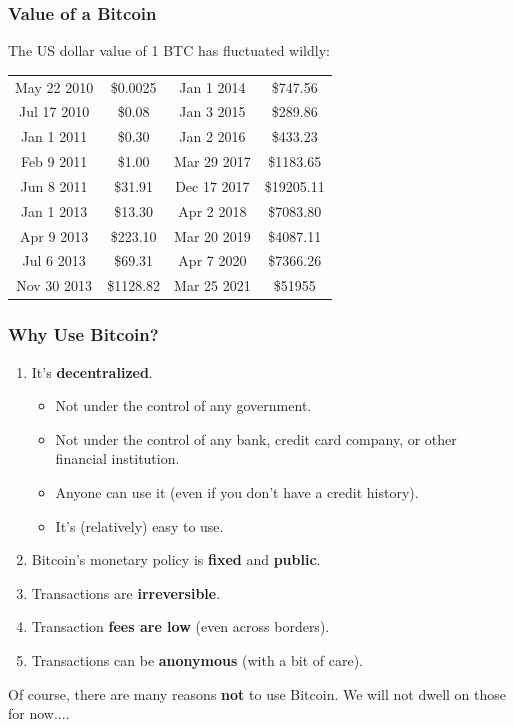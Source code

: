 \documentclass[12pt,titlepage]{article}
\begin{document}
\subsubsection{Value of a Bitcoin}
The US dollar value of 1 BTC has ﬂuctuated wildly:
\begin{center}
	\begin{tabular}{|cc|cc|}
		\hline
		May 22 2010 & \$0.0025 & Jan 1 2014 & \$747.56\\
		Jul 17 2010 & \$0.08 & Jan 3 2015 & \$289.86\\
		Jan 1 2011 & \$0.30 & Jan 2 2016 & \$433.23\\
		Feb 9 2011 & \$1.00 & Mar 29 2017 & \$1183.65\\
		Jun 8 2011 & \$31.91 & Dec 17 2017 & \$19205.11\\
		Jan 1 2013 & \$13.30 & Apr 2 2018 & \$7083.80\\
		Apr 9 2013 & \$223.10 & Mar 20 2019 & \$4087.11\\
		Jul 6 2013 & \$69.31 & Apr 7 2020 & \$7366.26\\
		Nov 30 2013 & \$1128.82 & Mar 25 2021 & \$51955\\ 
		\hline
	\end{tabular}
\end{center}
\subsubsection{Why Use Bitcoin?}
\begin{enumerate}
	\item It’s \textbf{decentralized}.\begin{itemize}
		\item Not under the control of any government.
		\item Not under the control of any bank, credit card company, or other financial institution.
		\item Anyone can use it (even if you don’t have a credit history).
		\item It’s (relatively) easy to use.
	\end{itemize}
	\item Bitcoin’s monetary policy is \textbf{fixed} and \textbf{public}.
	\item Transactions are \textbf{irreversible}.
	\item Transaction \textbf{fees are low} (even across borders).
	\item Transactions can be \textbf{anonymous} (with a bit of care).
\end{enumerate}
Of course, there are many reasons \textbf{not} to use Bitcoin. We will not dwell on those for now....
\end{document}
